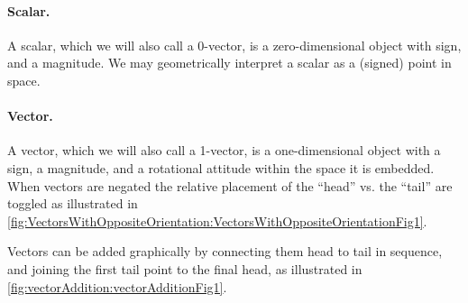 \paragraph{Scalar.}
A scalar, which we will also call a 0-vector, is a zero-dimensional object with sign, and a magnitude.
We may geometrically interpret a scalar as a (signed) point in space.

\paragraph{Vector.}
A vector, which we will also call a 1-vector, is a one-dimensional object with a sign, a magnitude, and a rotational attitude within the space it is embedded.
When vectors are negated the relative placement of the ``head'' vs. the ``tail'' are toggled as illustrated in \cref{fig:VectorsWithOppositeOrientation:VectorsWithOppositeOrientationFig1}.

Vectors can be added graphically by connecting them head to tail in sequence, and joining the first tail point to the final head, as
illustrated in
\cref{fig:vectorAddition:vectorAdditionFig1}.

